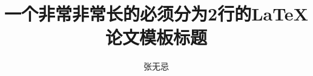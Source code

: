 \documentclass[master,oneside]{cuzthesis} %
\title{一个非常非常长的必须分为2行的\LaTeX 论文模板标题} %
\author{张无忌}              %
\institute{新媒体学院}		%
\begin{document}
\maketitle

\abstractmatter



\frontmatter
\tableofcontents %
\listoffigures   %
\listoftables    %
%

\mainmatter



\backmatter



%




\end{document}
